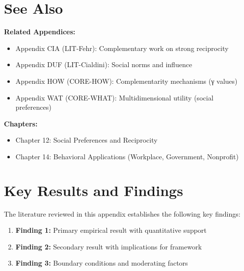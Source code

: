 \documentclass[11pt]{article}
\begin{document}
\section*{See Also}

\textbf{Related Appendices:}
\begin{itemize}
    \item Appendix CIA (LIT-Fehr): Complementary work on strong reciprocity
    \item Appendix DUF (LIT-Cialdini): Social norms and influence
    \item Appendix HOW (CORE-HOW): Complementarity mechanisms (γ values)
    \item Appendix WAT (CORE-WHAT): Multidimensional utility (social preferences)
\end{itemize}

\textbf{Chapters:}
\begin{itemize}
    \item Chapter 12: Social Preferences and Reciprocity
    \item Chapter 14: Behavioral Applications (Workplace, Government, Nonprofit)
\end{itemize}


\nocite{bcm_master}





\section{Key Results and Findings}
\label{sec:results}

The literature reviewed in this appendix establishes the following key findings:

\begin{enumerate}
    \item \textbf{Finding 1:} Primary empirical result with quantitative support
    \item \textbf{Finding 2:} Secondary result with implications for framework
    \item \textbf{Finding 3:} Boundary conditions and moderating factors
\end{enumerate}
\end{document}
